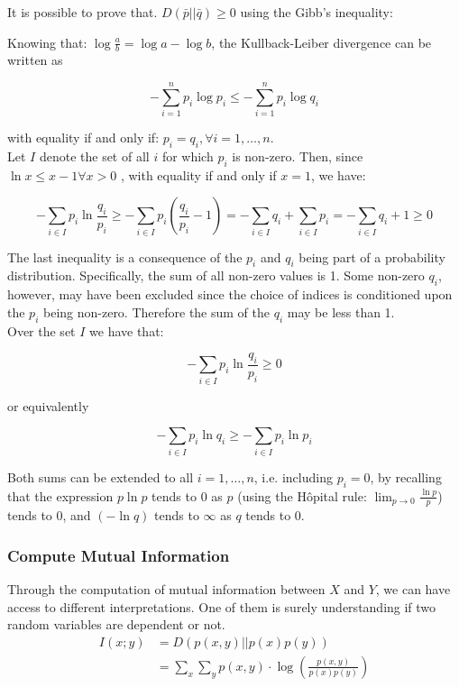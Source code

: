 It is possible to prove that. $D(\bar{p} || \bar{q}) \geq 0$ using the Gibb's inequality:

Knowing that: $\log \frac{a}{b} = \log a - \log b $, the Kullback-Leiber divergence can be written as

\begin{equation*}
    -\sum_{i=1}^n p_i \log p_i \leq - \sum_{i=1}^n p_i \log q_i
\end{equation*}

with equality if and only if: $p_i = q_i, \forall i = 1, \dots, n$.\\
Let $I$ denote the set of all $i$ for which $p_i$ is non-zero. Then, since $\ln x \leq x-1 \forall x > 0$ , with equality if and only if $x=1$, we have:

\begin{equation*}
    - \sum_{i \in I} p_i \ln \frac{q_i}{p_i} \geq  - \sum_{i \in I} p_i \left( \frac{q_i}{p_i} - 1 \right) = - \sum_{i \in I} q_i + \sum_{i \in I} p_i = - \sum_{i \in I} q_i + 1 \geq 0
\end{equation*}

The last inequality is a consequence of the $p_i$ and $q_i$ being part of a probability distribution. Specifically, the sum of all non-zero values is 1. 
Some non-zero $q_i$, however, may have been excluded since the choice of indices is conditioned upon the $p_i$ being non-zero. 
Therefore the sum of the $q_i$ may be less than 1.\\
Over the set $I$ we have that:

\begin{equation*}
    - \sum_{i \in I} p_i \ln \frac{q_i}{p_i} \geq 0
\end{equation*}

or equivalently

\begin{equation*}
    - \sum_{i \in I} p_i \ln q_i \geq - \sum_{i \in I} p_i \ln p_i
\end{equation*}
 
Both sums can be extended to all $i=1, \ldots, n$, i.e. including $p_i=0$, by recalling that the expression $p \ln p$ tends to 0 as $p$ 
(using the Hôpital rule: $\lim_{p \to 0}\frac{\ln p}{p}$) tends to 0, and $(-\ln q)$ tends to $\infty$ as $q$ tends to 0.

\subsubsection{Compute Mutual Information}
Through the computation of mutual information between $X$ and $Y$, we can have access to different interpretations. One of them is surely understanding if two random variables are dependent or not. 
\begin{equation*}
\begin{split}
I(x;y) &= D(p(x,y)||p(x)p(y))\\
&=\sum_x \sum_y p(x,y) \cdot \log\left(\frac{p(x,y)}{p(x)p(y)} \right)
\end{split}
\end{equation*}

